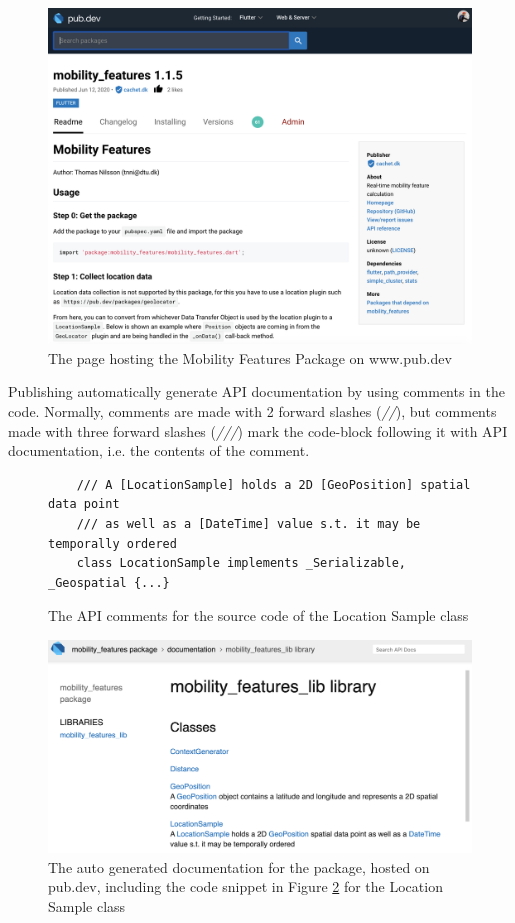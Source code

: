 \begin{figure}
    \centering
    \includegraphics[width=\textwidth]{images/pub.png}
    \caption{The page hosting the Mobility Features Package on www.pub.dev}
    \label{fig:pub-package}
\end{figure}

Publishing automatically generate API documentation by using comments in the code. Normally, comments are made with 2 forward slashes (\textit{//}), but comments made with three forward slashes (\textit{///}) mark the code-block following it with API documentation, i.e. the contents of the comment. 

\begin{figure}
    \centering
    \begin{verbatim}
    /// A [LocationSample] holds a 2D [GeoPosition] spatial data point
    /// as well as a [DateTime] value s.t. it may be temporally ordered
    class LocationSample implements _Serializable, _Geospatial {...}
    \end{verbatim}
    \caption{The API comments for the source code of the Location Sample class}
    \label{fig:api-comments}
\end{figure}

\begin{figure}
    \centering
    \includegraphics[width=\textwidth]{images/docs.png}
    \caption{The auto generated documentation for the package, hosted on pub.dev, including the code snippet in Figure \ref{fig:api-comments} for the Location Sample class}
    \label{fig:api-docs}
\end{figure}

